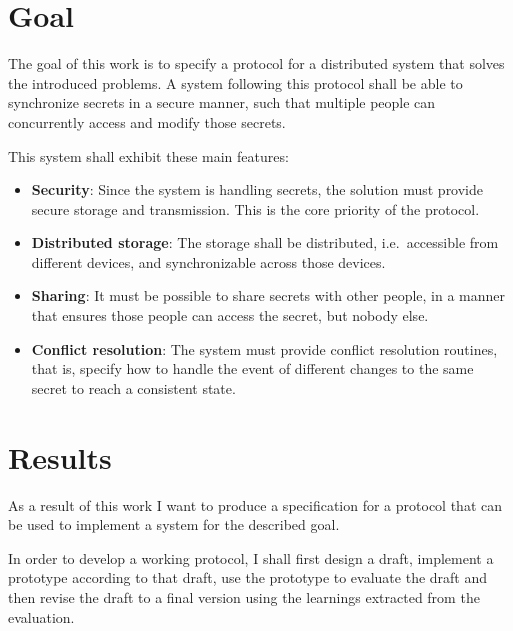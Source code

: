 \section{Goal}

The goal of this work is to specify a protocol for a distributed system that
solves the introduced problems. A system following this protocol shall be able
to synchronize secrets in a secure manner, such that multiple people can
concurrently access and modify those secrets.

This system shall exhibit these main features:

\begin{itemize}
    \item \textbf{Security}: Since the system is handling secrets, the solution
        must provide secure storage and transmission. This is the core priority
        of the protocol.

    \item \textbf{Distributed storage}: The storage shall be distributed, i.e.\ 
        accessible from different devices, and synchronizable across those
        devices. 

    \item \textbf{Sharing}: It must be possible to share secrets with other
        people, in a manner that ensures those people can access the secret,
        but nobody else.
        
    \item \textbf{Conflict resolution}: The system must provide conflict
        resolution routines, that is, specify how to handle the event of
        different changes to the same secret to reach a consistent state.

\end{itemize}

\section{Results}

As a result of this work I want to produce a specification for a protocol that
can be used to implement a system for the described goal.

In order to develop a working protocol, I shall first design a draft, implement
a prototype according to that draft, use the prototype to evaluate the draft
and then revise the draft to a final version using the learnings extracted from
the evaluation.

